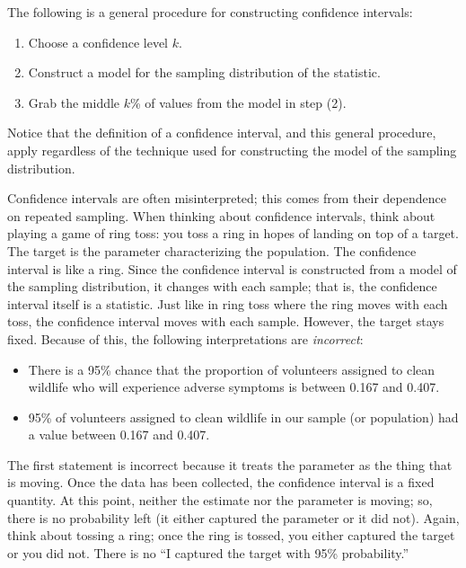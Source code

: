 \documentclass[]{book}
\providecommand{\tightlist}{%
  \setlength{\itemsep}{0pt}\setlength{\parskip}{0pt}}
\theoremstyle{plain}
\theoremstyle{mydefn}
\theoremstyle{myexmpl}
\theoremstyle{remark}
\let\BeginKnitrBlock\begin \let\EndKnitrBlock\end
\let\BeginKnitrBlock\begin \let\EndKnitrBlock\end
\begin{document}
\BeginKnitrBlock{rmdtip}
The following is a general procedure for constructing confidence
intervals:

\begin{enumerate}
\def\labelenumi{\arabic{enumi}.}
\tightlist
\item
  Choose a confidence level \(k\).
\item
  Construct a model for the sampling distribution of the statistic.
\item
  Grab the middle \(k\)\% of values from the model in step (2).
\end{enumerate}

Notice that the definition of a confidence interval, and this general
procedure, apply regardless of the technique used for constructing the
model of the sampling distribution.
\EndKnitrBlock{rmdtip}

Confidence intervals are often misinterpreted; this comes from their
dependence on repeated sampling. When thinking about confidence
intervals, think about playing a game of ring toss: you toss a ring in
hopes of landing on top of a target. The target is the parameter
characterizing the population. The confidence interval is like a ring.
Since the confidence interval is constructed from a model of the
sampling distribution, it changes with each sample; that is, the
confidence interval itself is a statistic. Just like in ring toss where
the ring moves with each toss, the confidence interval moves with each
sample. However, the target stays fixed. Because of this, the following
interpretations are \emph{incorrect}:

\begin{itemize}
\tightlist
\item
  There is a 95\% chance that the proportion of volunteers assigned to
  clean wildlife who will experience adverse symptoms is between 0.167
  and 0.407.
\item
  95\% of volunteers assigned to clean wildlife in our sample (or
  population) had a value between 0.167 and 0.407.
\end{itemize}

The first statement is incorrect because it treats the parameter as the
thing that is moving. Once the data has been collected, the confidence
interval is a fixed quantity. At this point, neither the estimate nor
the parameter is moving; so, there is no probability left (it either
captured the parameter or it did not). Again, think about tossing a
ring; once the ring is tossed, you either captured the target or you did
not. There is no ``I captured the target with 95\% probability.''
\end{document}
